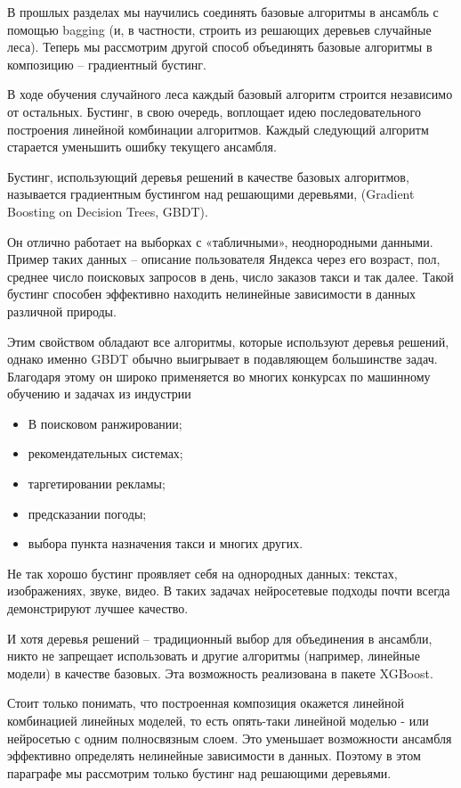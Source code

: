 В прошлых разделах мы научились соединять базовые алгоритмы в ансамбль с помощью bagging
(и, в частности, строить из решающих деревьев случайные леса).
Теперь мы рассмотрим другой способ объединять базовые алгоритмы в композицию -- градиентный бустинг.

В ходе обучения случайного леса каждый базовый алгоритм строится независимо от остальных.
Бустинг, в свою очередь, воплощает идею последовательного построения линейной комбинации алгоритмов.
Каждый следующий алгоритм старается уменьшить ошибку текущего ансамбля.

Бустинг, использующий деревья решений в качестве базовых алгоритмов, называется градиентным бустингом над решающими
деревьями, (Gradient Boosting on Decision Trees, GBDT).

Он отлично работает на выборках с «табличными», неоднородными данными.
Пример таких данных -- описание пользователя Яндекса через его возраст, пол, среднее число поисковых запросов в
день, число заказов такси и так далее.
Такой бустинг способен эффективно находить нелинейные зависимости в данных различной природы.

Этим свойством обладают все алгоритмы, которые используют деревья решений, однако именно GBDT обычно выигрывает в
подавляющем большинстве задач.
Благодаря этому он широко применяется во многих конкурсах по машинному обучению и задачах из индустрии

\begin{itemize}
    \item В поисковом ранжировании;
    \item рекомендательных системах;
    \item таргетировании рекламы;
    \item предсказании погоды;
    \item выбора пункта назначения такси и многих других.
\end{itemize}

Не так хорошо бустинг проявляет себя на однородных данных: текстах, изображениях, звуке, видео.
В таких задачах нейросетевые подходы почти всегда демонстрируют лучшее качество.

И хотя деревья решений -- традиционный выбор для объединения в ансамбли, никто не запрещает использовать и другие
алгоритмы (например, линейные модели) в качестве базовых.
Эта возможность реализована в пакете XGBoost.

Стоит только понимать, что построенная композиция окажется линейной комбинацией линейных моделей, то есть опять-таки
линейной моделью - или нейросетью с одним полносвязным слоем.
Это уменьшает возможности ансамбля эффективно определять нелинейные зависимости в данных.
Поэтому в этом параграфе мы рассмотрим только бустинг над решающими деревьями.

